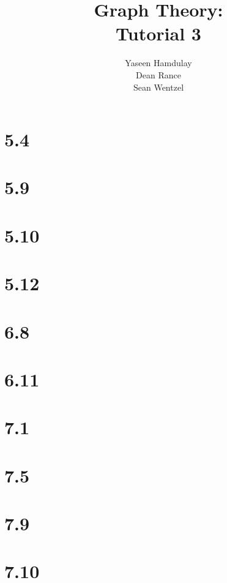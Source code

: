 \documentclass[12pt,a4paper]{article}
\title{{\bf Graph Theory:}\\
Tutorial 3}
\author{Yaseen Hamdulay \\
	Dean Rance \\
	Sean Wentzel}
\newcommand{\q}[1]{
\section*{#1}

}
\begin{document}
\maketitle
\q{5.4}

\q{5.9}

\q{5.10}

\q{5.12}

\q{6.8}

\q{6.11}

\q{7.1}

\q{7.5}

\q{7.9}

\q{7.10}


\end{document}
